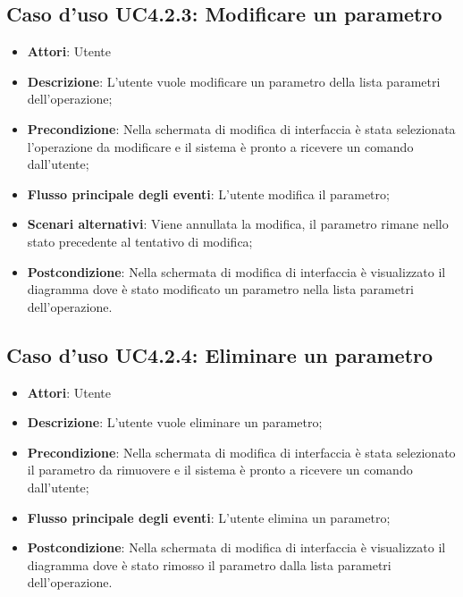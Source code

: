 \documentclass[../AnalisiDeiRequisiti.tex]{subfiles}
\begin{document}
			\subsection{Caso d'uso UC4.2.3: Modificare un parametro}
			\begin{itemize}
				\item \textbf{Attori}: Utente
				\item \textbf{Descrizione}: L'utente vuole modificare un parametro della lista parametri dell'operazione;
				\item \textbf{Precondizione}: Nella schermata di modifica di interfaccia è stata selezionata l'operazione da modificare e il sistema è pronto a ricevere un comando dall'utente;
				\item \textbf{Flusso principale degli eventi}: L'utente modifica il parametro;
				\item \textbf{Scenari alternativi}: Viene annullata la modifica, il parametro rimane nello stato precedente al tentativo di modifica;
				\item \textbf{Postcondizione}: Nella schermata di modifica di interfaccia è visualizzato il diagramma dove è stato modificato un parametro nella lista parametri dell'operazione.
			\end{itemize}
			\subsection{Caso d'uso UC4.2.4: Eliminare un parametro}
			\begin{itemize}
				\item \textbf{Attori}: Utente
				\item \textbf{Descrizione}: L'utente vuole eliminare un parametro;
				\item \textbf{Precondizione}: Nella schermata di modifica di interfaccia è stata selezionato il parametro da rimuovere e il sistema è pronto a ricevere un comando dall'utente;
				\item \textbf{Flusso principale degli eventi}: L'utente elimina un parametro;
				\item \textbf{Postcondizione}: Nella schermata di modifica di interfaccia è visualizzato il diagramma dove è stato rimosso il parametro dalla lista parametri dell'operazione.	
			\end{itemize}
\end{document}
